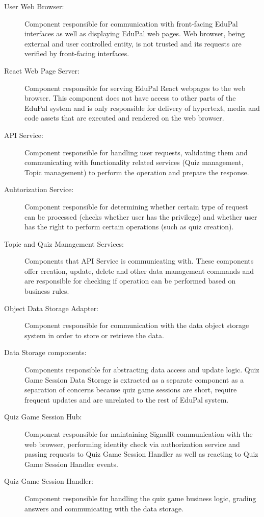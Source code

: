 \begin{description}
  \item[User Web Browser:] Component responsible for communication with front-facing EduPal interfaces as well as displaying EduPal web pages. Web browser, being external and user controlled entity, is not trusted and its requests are verified by front-facing interfaces.
  \item[React Web Page Server:] Component responsible for serving EduPal React webpages to the web browser. This component does not have access to other parts of the EduPal system and is only responsible for delivery of hypertext, media and code assets that are executed and rendered on the web browser.
  \item[API Service:] Component responsible for handling user requests, validating them and communicating with functionality related services (Quiz management, Topic management) to perform the operation and prepare the response.
  \item[Auhtorization Service:] Component responsible for determining whether certain type of request can be processed (checks whether user has the privilege) and whether user has the right to perform certain operations (such as quiz creation).
  \item[Topic and Quiz Management Services:] Components that API Service is communicating with. These components offer creation, update, delete and other data management commands and are responsible for checking if operation can be performed based on business rules.
  \item[Object Data Storage Adapter:] Component responsible for communication with the data object storage system in order to store or retrieve the data. 
  \item[Data Storage components:] Components responsible for abstracting data access and update logic. Quiz Game Session Data Storage is extracted as a separate component as a separation of concerns because quiz game sessions are short, require frequent updates and are unrelated to the rest of EduPal system.
  \item[Quiz Game Session Hub:] Component responsible for maintaining SignalR communication with the web browser, performing identity check via authorization service and passing requests to Quiz Game Session Handler as well as reacting to Quiz Game Session Handler events.
  \item[Quiz Game Session Handler:] Component responsible for handling the quiz game business logic, grading answers and communicating with the data storage.
\end{description}
  
